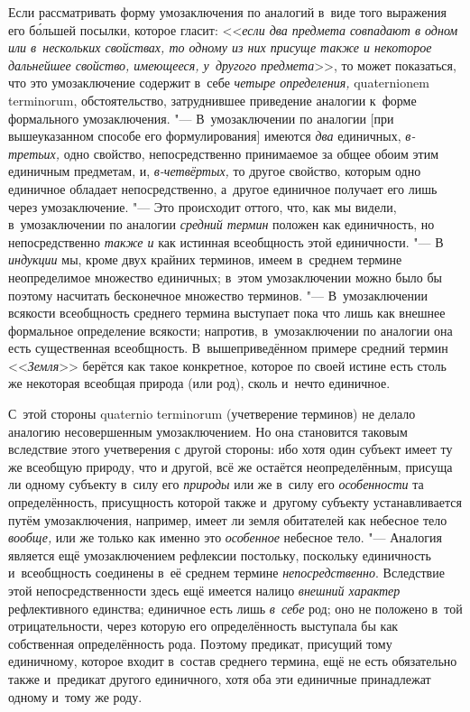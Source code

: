 Если рассматривать форму умозаключения по аналогий в~виде того
выражения его б\'{о}льшей посылки, которое гласит:
<<{\em если два предмета совпадают в
одном или в~нескольких свойствах, то одному из них присуще также и
некоторое дальнейшее свойство, имеющееся, у~другого предмета}>>,
то может показаться, что это умозаключение содержит в~себе
{\em четыре определения,} quaterni\-onem
termi\-norum, обстоятельство, затруднившее приведение аналогии
к~форме формального умозаключения. "--- В~умозаключении по
аналогии [при вышеуказанном способе его формулирования] имеются
{\em два} единичных,
{\em в-третьих,} одно
свойство, непосредственно принимаемое за общее обоим этим единичным
предметам, и, {\em в-четвёртых,}
то другое свойство, которым одно единичное обладает
непосредственно, а~другое единичное получает его лишь через умозаключение.
"--- Это происходит оттого, что, как мы видели, в~умозаключении
по аналогии {\em средний термин}
положен как единичность, но непосредственно
{\em также и} как
истинная всеобщность этой единичности. "--- В
{\em индукции} мы, кроме
двух крайних терминов, имеем в~среднем термине неопределимое множество
единичных; в~этом умозаключении можно было бы поэтому насчитать бесконечное
множество терминов. "--- В~умозаключении всякости всеобщность
среднего термина выступает пока что лишь как внешнее формальное определение
всякости; напротив, в~умозаключении по аналогии она есть существенная
всеобщность. В~вышеприведённом примере средний термин
<<{\em Земля}>> берётся как
такое конкретное, которое по своей истине есть столь же некоторая всеобщая
природа (или род), сколь и~нечто единичное.

С~этой стороны quaternio terminorum
(учетверение терминов) не делало аналогию несовершенным
умозаключением. Но она становится таковым вследствие этого учетверения с
другой стороны: ибо хотя один субъект имеет ту же всеобщую природу, что и
другой, всё же остаётся неопределённым, присуща ли одному субъекту в~силу
его {\em природы} или же
в~силу его {\em особенности}
та определённость, присущность которой также и~другому
субъекту устанавливается путём умозаключения, например, имеет ли земля
обитателей как небесное тело
{\em вообще,} или же
только как именно это {\em особенное}
небесное тело. "--- Аналогия является ещё
умозаключением рефлексии постольку, поскольку единичность и~всеобщность
соединены в~её среднем термине
{\em непосредственно}.
Вследствие этой непосредственности здесь ещё имеется налицо
{\em внешний характер}
рефлективного единства; единичное есть лишь
{\em в~себе} род; оно не
положено в~той отрицательности, через которую его определённость выступала
бы как собственная определённость рода. Поэтому предикат, присущий тому
единичному, которое входит в~состав среднего термина, ещё не есть
обязательно также и~предикат другого единичного, хотя оба эти единичные
принадлежат одному и~тому же роду.

